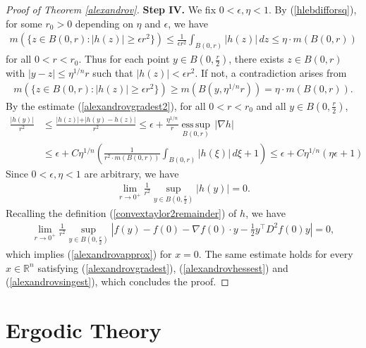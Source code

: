 \documentclass{article}
\numberwithin{equation}{section}
\newcommand{\bbR}{\mathbb{R}}
\DeclareMathOperator{\esssup}{ess\,sup}
\theoremstyle{plain}
\theoremstyle{definition}
\begin{document}
\begin{proof}[Proof of Theorem \ref{alexandrov}]
\item\textbf{Step IV.} We fix $0<\epsilon,\eta<1$. By (\ref{hlebdifforsq}), for some $r_0>0$ depending on $\eta$ and $\epsilon$, we have
\begin{align*}
	m(\{z\in B(0,r):\vert h(z)\vert\geq\epsilon r^2\})\leq\frac{1}{\epsilon r^2}\int_{B(0,r)}\vert h(z)\vert\,dz\leq\eta\cdot m(B(0,r))
\end{align*}
for all $0<r<r_0$. Thus for each point $y\in B(0,\frac{r}{2})$, there exists $z\in B(0,r)$ with $\vert y-z\vert\leq\eta^{1/n}r$ such that $\vert h(z)\vert<\epsilon r^2$. If not, a contradiction arises from
\begin{align*}
	m(\{z\in B(0,r):\vert h(z)\vert\geq\epsilon r^2\})\geq m(B(y,\eta^{1/n}r))=\eta\cdot m(B(0,r)).
\end{align*}
By the estimate (\ref{alexandrovgradest2}), for all $0<r<r_0$ and all $y\in B(0,\frac{r}{2})$,
\begin{align*}
	\frac{\vert h(y)\vert}{r^2}&\leq\frac{\vert h(z)\vert+\vert h(y)-h(z)\vert}{r^2}\leq \epsilon+\frac{\eta^{1/n}}{r}\underset{B(0,r)}{\esssup}\,\vert\nabla h\vert\\
	&\leq\epsilon+C\eta^{1/n}\left(\frac{1}{r^2\cdot m(B(0,r))}\int_{B(0,r)}\vert h(\xi)\vert\,d\xi+1\right)\leq\epsilon+C\eta^{1/n}\left(\eta\epsilon+1\right)
\end{align*}
Since $0<\epsilon,\eta<1$ are arbitrary, we have
\begin{align*}
	\lim_{r\to 0^+}\frac{1}{r^2}\sup_{y\in B(0,\frac{r}{2})}\vert h(y)\vert=0.
\end{align*}
Recalling the definition (\ref{convextaylor2remainder}) of $h$, we have
\begin{align*}
\lim_{r\to 0^+}\frac{1}{r^2}\sup_{y\in B(0,\frac{r}{2})}\left\vert f(y)-f(0)-\nabla f(0)\cdot y-\frac{1}{2}y^\top D^2f(0)y\right\vert=0,
\end{align*}
which implies (\ref{alexandrovapprox}) for $x=0$. The same estimate holds for every $x\in\bbR^n$ satisfying (\ref{alexandrovgradest}), (\ref{alexandrovhessest}) and (\ref{alexandrovsingest}), which concludes the proof.
\end{proof}


\newpage
\section{Ergodic Theory}
\end{document}
